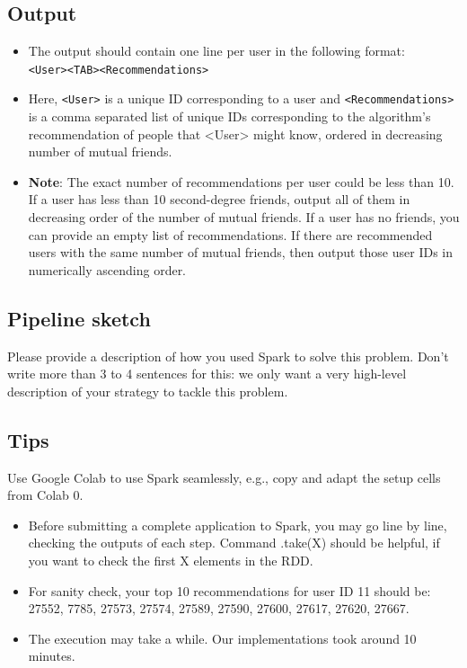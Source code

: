 \documentclass[paper=a4, fontsize=11pt]{scrartcl} %
\numberwithin{equation}{section} %
\numberwithin{figure}{section} %
\numberwithin{table}{section} %
\begin{document}
\subsection{Output}
\begin{itemize}
    \item The output should contain one line per user in the following format: \\ \verb"<User><TAB><Recommendations>"
    \item Here, \verb"<User>" is a unique ID corresponding to a user and \verb"<Recommendations>" is a comma separated list of unique IDs corresponding to the algorithm’s recommendation of people that <User> might know, ordered in decreasing number of mutual friends. 
    \item \textbf{Note}: The exact number of recommendations per user could be less than 10. If a user has less than 10 second-degree friends, output all of them in decreasing order of the number of mutual friends. If a user has no friends, you can provide an empty list of recommendations. If there are recommended users with the same number of mutual friends, then output those user IDs in numerically ascending order.
\end{itemize}

\subsection{Pipeline sketch}
Please provide a description of how you used Spark to solve this problem. Don’t write more than 3 to 4 sentences for this: we only want a very high-level description of your strategy to tackle this problem. 

\subsection{Tips}
 Use Google Colab to use Spark seamlessly, e.g., copy and adapt the setup cells from Colab 0. 
 
\begin{itemize}
    \item Before submitting a complete application to Spark, you may go line by line, checking the outputs of each step. Command .take(X) should be helpful, if you want to check the first X elements in the RDD. 
    \item For sanity check, your top 10 recommendations for user ID 11 should be: \\ 27552, 7785, 27573, 27574, 27589, 27590, 27600, 27617, 27620, 27667. 
    \item The execution may take a while. Our implementations took around 10 minutes. 
\end{itemize}
\end{document}
